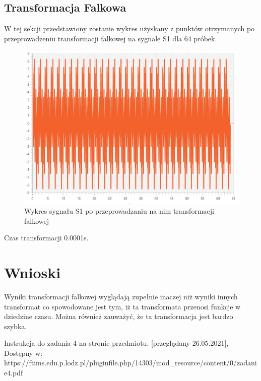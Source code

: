 \documentclass[12pt]{article}
\begin{document}
\subsection{Transformacja Falkowa}
W tej sekcji przedstawiony zostanie wykres użyskany z punktów otrzymanych po przeprowadzeniu transformacji falkowej na sygnale S1 dla 64 próbek.
\begin{figure}[H]
	\centering
	\includegraphics[width=\linewidth]{falkowa-s1}
	\caption{Wykres sygnału S1 po przeprowadzaniu na nim transformacji falkowej}
	\label{s1-falkowa}
\end{figure}
Czas transformacji 0.0001s.


\section{Wnioski}
Wyniki transformacji falkowej wyglądają zupełnie inaczej niż wyniki innych transformat co spowodowane jest tym, iż ta transformata przenosi funkcje w dziedzine czasu. Można również zauważyć, że ta transformacja jest bardzo szybka.
\begin{thebibliography}{}
 Instrukcja do zadania 4 na stronie przedmiotu. [przeglądany 26.05.2021], Dostępny w: https://ftims.edu.p.lodz.pl/pluginfile.php/14303/mod\_resource/content/0/zadanie4.pdf


\end{thebibliography}
\end{document}
